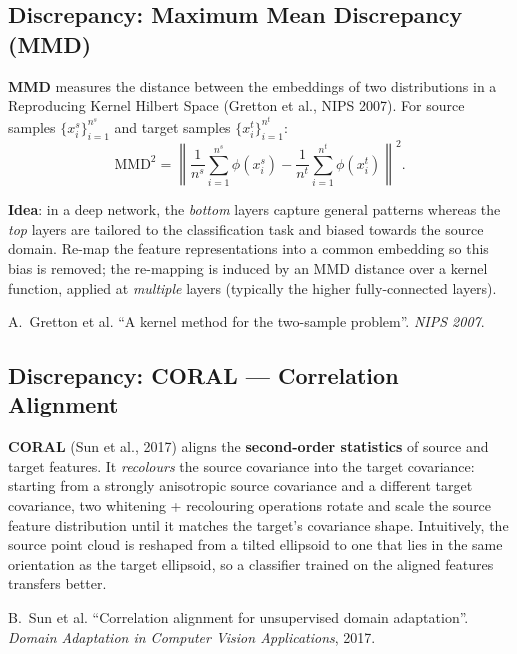 \documentclass[11pt,a4paper]{article}
\theoremstyle{definition}
\theoremstyle{plain}
\theoremstyle{remark}
\begin{document}
\subsection{Discrepancy: Maximum Mean Discrepancy (MMD)}

\textbf{MMD} measures the distance between the embeddings of two distributions in a Reproducing Kernel Hilbert Space (Gretton et al., NIPS 2007). For source samples $\{x^s_i\}_{i=1}^{n^s}$ and target samples $\{x^t_i\}_{i=1}^{n^t}$:
\begin{equation}
    \mathrm{MMD}^2 = \left\| \frac{1}{n^s}\sum_{i=1}^{n^s}\phi(x^s_i) - \frac{1}{n^t}\sum_{i=1}^{n^t}\phi(x^t_i) \right\|^2.
\end{equation}

\textbf{Idea}: in a deep network, the \emph{bottom} layers capture general patterns whereas the \emph{top} layers are tailored to the classification task and biased towards the source domain. Re-map the feature representations into a common embedding so this bias is removed; the re-mapping is induced by an MMD distance over a kernel function, applied at \emph{multiple} layers (typically the higher fully-connected layers).

\begin{tcolorbox}[colback=blue!5!white,colframe=blue!60!black,title={Reference}]
A.\ Gretton et al. ``A kernel method for the two-sample problem''. \textit{NIPS 2007}.
\end{tcolorbox}

\subsection{Discrepancy: CORAL --- Correlation Alignment}

\textbf{CORAL} (Sun et al., 2017) aligns the \textbf{second-order statistics} of source and target features. It \emph{recolours} the source covariance into the target covariance: starting from a strongly anisotropic source covariance and a different target covariance, two whitening + recolouring operations rotate and scale the source feature distribution until it matches the target's covariance shape. Intuitively, the source point cloud is reshaped from a tilted ellipsoid to one that lies in the same orientation as the target ellipsoid, so a classifier trained on the aligned features transfers better.

\begin{tcolorbox}[colback=blue!5!white,colframe=blue!60!black,title={Reference}]
B.\ Sun et al. ``Correlation alignment for unsupervised domain adaptation''. \textit{Domain Adaptation in Computer Vision Applications}, 2017.
\end{tcolorbox}
\end{document}

